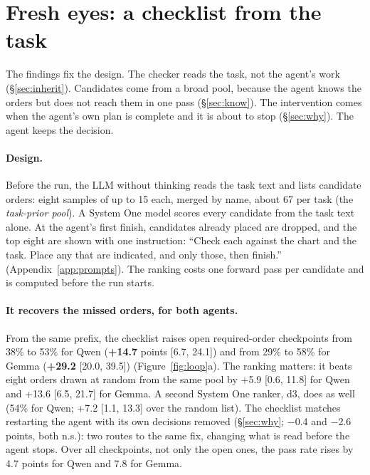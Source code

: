 \documentclass[11pt]{article}
\newcommand{\up}[1]{\textbf{+#1}}
\begin{document}
\section{Fresh eyes: a checklist from the task}\label{sec:fresh}

The findings fix the design. The checker reads the task, not the agent's work (\S\ref{sec:inherit}). Candidates come
from a broad pool, because the agent knows the orders but does not reach them in one pass (\S\ref{sec:know}). The
intervention comes when the agent's own plan is complete and it is about to stop (\S\ref{sec:why}). The agent keeps
the decision.

\paragraph{Design.} Before the run, the LLM without thinking reads the task text and lists candidate orders: eight
samples of up to 15 each, merged by name, about 67 per task (the \emph{task-prior pool}). A System One model scores
every candidate from the task text alone. At the agent's first finish, candidates already placed are dropped, and the
top eight are shown with one instruction: ``Check each against the chart and the task. Place any that are indicated,
and only those, then finish.'' (Appendix~\ref{app:prompts}). The ranking costs one forward pass per candidate and is
computed before the run starts.

\paragraph{It recovers the missed orders, for both agents.} From the same prefix, the checklist raises open
required-order checkpoints from 38\% to 53\% for Qwen (\up{14.7} points [6.7, 24.1]) and from 29\% to 58\% for Gemma
(\up{29.2} [20.0, 39.5]) (Figure~\ref{fig:loop}a). The ranking matters: it beats eight orders drawn at random from the
same pool by +5.9 [0.6, 11.8] for Qwen and +13.6 [6.5, 21.7] for Gemma. A second System One ranker, d3, does as well
(54\% for Qwen; +7.2 [1.1, 13.3] over the random list). The checklist matches restarting the agent with its own
decisions removed (\S\ref{sec:why}; $-$0.4 and $-$2.6 points, both n.s.): two routes to the same fix, changing what is
read before the agent stops. Over all checkpoints, not only the open ones, the pass rate rises by 4.7 points for Qwen
and 7.8 for Gemma.
\end{document}
